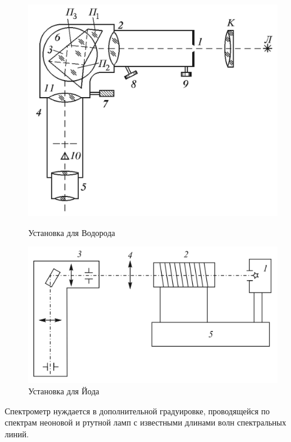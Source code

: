 \documentclass[a4paper]{article}
\begin{document}
\begin{figure}[h]
	\begin{center}
	\begin{minipage}[h]{0.45\linewidth}
	\includegraphics[width=1\linewidth]{p2.png}
	\caption{Установка для Водорода} 
	\label{p2}
	\end{minipage}
	\hfill 
	\begin{minipage}[h]{0.45\linewidth}
	\includegraphics[width=1\linewidth]{p3.png}
	\caption{Установка для Йода}
	\label{p3}
	\end{minipage}
	\end{center}
\end{figure}

Спектрометр нуждается в дополнительной градуировке, проводящейся по спектрам неоновой и ртутной ламп с 
известными длинами волн спектральных линий.
\end{document}
